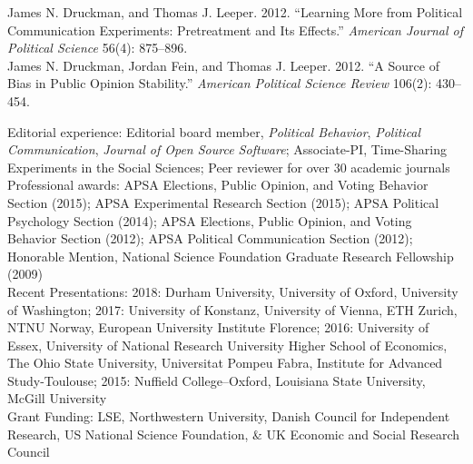 \documentclass[12pt]{article}
\renewcommand{\section}[1]{\pagebreak[3]%
    \llap{\scshape\smash{\parbox[t]{\marginparwidth}{\raggedright {\color{black}#1}}}}%
    \vspace{-\baselineskip}\par}
\newcommand{\entry}[1]{\indent {\color{lg}\guillemotright}\hspace{2pt}#1\vspace{.25em}\\}
\newcommand{\hzline}[0]{\noindent\makebox[\linewidth]{\rule{\textwidth}{0.4pt}}}
\begin{document}
	\entry{James N. Druckman, and Thomas J. Leeper. 2012. ``Learning More from Political Communication Experiments: Pretreatment and Its Effects.'' {\em American Journal of Political Science} 56(4): 875--896.}
	\entry{James N. Druckman, Jordan Fein, and Thomas J. Leeper. 2012. ``A Source of Bias in Public Opinion Stability.'' {\em American Political Science Review} 106(2): 430--454.}
\hzline

\section{Other Relevant Experience}
\entry{Editorial experience: Editorial board member, \textit{Political Behavior}, \textit{Political Communication}, \textit{Journal of Open Source Software}; Associate-PI, Time-Sharing Experiments in the Social Sciences; Peer reviewer for over 30 academic journals}
\entry{Professional awards: APSA Elections, Public Opinion, and Voting Behavior Section (2015); APSA Experimental Research Section (2015); APSA Political Psychology Section (2014); APSA Elections, Public Opinion, and Voting Behavior Section (2012); APSA Political Communication Section (2012); Honorable Mention, National Science Foundation Graduate Research Fellowship (2009)}
\entry{Recent Presentations: 2018: Durham University, University of Oxford, University of Washington; 2017: University of Konstanz, University of Vienna, ETH Zurich, NTNU Norway, European University Institute Florence; 2016: University of Essex, University of National Research University Higher School of Economics, The Ohio State University, Universitat Pompeu Fabra, Institute for Advanced Study-Toulouse; 2015: Nuffield College--Oxford, Louisiana State University, McGill University}
\entry{Grant Funding: LSE, Northwestern University, Danish Council for Independent Research, US National Science Foundation, \& UK Economic and Social Research Council}
\hzline
\end{document}
